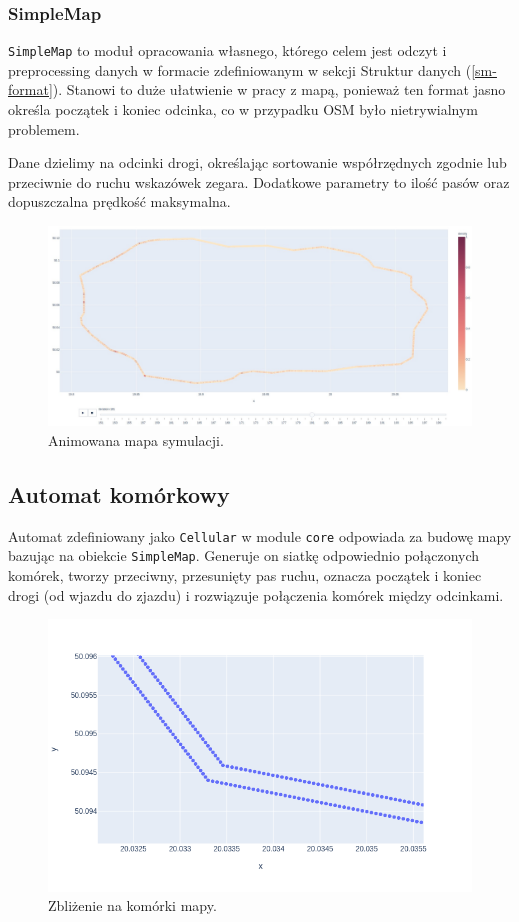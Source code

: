 \documentclass[a4paper,12pt]{article}
\begin{document}
    \subsubsection{SimpleMap}
    \texttt{SimpleMap} to moduł opracowania własnego, którego celem jest odczyt i preprocessing danych w formacie zdefiniowanym w sekcji Struktur danych (\ref{sm-format}).
    Stanowi to duże ułatwienie w pracy z mapą, ponieważ ten format jasno określa początek i koniec odcinka, co w przypadku OSM było nietrywialnym problemem.
    
    Dane dzielimy na odcinki drogi, określając sortowanie współrzędnych zgodnie lub przeciwnie do ruchu wskazówek zegara. Dodatkowe parametry to ilość pasów oraz dopuszczalna prędkość maksymalna.
    
    \begin{figure}[h]
    	\centering
    	\includegraphics[width=\textwidth]{img/sim-map.jpg}
    	\caption{Animowana mapa symulacji.}
    \end{figure}
    
    \subsection{Automat komórkowy}
    Automat zdefiniowany jako \texttt{Cellular} w module \texttt{core} odpowiada za budowę mapy bazując na obiekcie \texttt{SimpleMap}. Generuje on siatkę odpowiednio połączonych komórek, tworzy przeciwny, przesunięty pas ruchu, oznacza początek i koniec drogi (od wjazdu do zjazdu) i rozwiązuje połączenia komórek między odcinkami.
    
    \begin{figure}[h]
    	\centering
    	\includegraphics[width=\textwidth]{img/note-map-zoom.png}
    	\caption{Zbliżenie na komórki mapy.}
    \end{figure}
\end{document}
